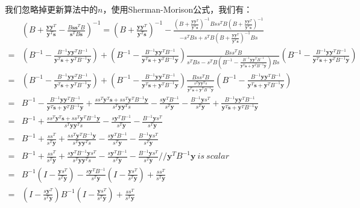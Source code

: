 我们忽略掉更新算法中的$n$，使用Sherman-Morison公式，我们有：
\begin{displaymath}
\begin{split}
&(B + \frac{\mathbf{y}\mathbf{y}^T}{\mathbf{y}^T\mathbf{s}} - \frac{B\mathbf{s}\mathbf{s}^TB}{\mathbf{s}^T B \mathbf{s}})^{-1}
=(B + \frac{\mathbf{y}\mathbf{y}^T}{\mathbf{y}^T\mathbf{s}})^{-1} -
\frac{(B + \frac{\mathbf{y}\mathbf{y}^T}{\mathbf{y}^T\mathbf{s}})^{-1}Bss^TB(B + \frac{\mathbf{y}\mathbf{y}^T}{\mathbf{y}^T\mathbf{s}})^{-1}}{-s^TBs+s^TB(B + \frac{\mathbf{y}\mathbf{y}^T}{\mathbf{y}^T\mathbf{s}})^{-1}Bs}\\
=&(B^{-1}-\frac{B^{-1}\mathbf{yy}^TB^{-1}}{\mathbf{y}^T\mathbf{s} + \mathbf{y}^TB^{-1}\mathbf{y}}) +
(B^{-1}-\frac{B^{-1}\mathbf{yy}^TB^{-1}}{\mathbf{y}^T\mathbf{s} + \mathbf{y}^TB^{-1}\mathbf{y}})
\frac{Bss^TB}{s^TBs-s^TB (B^{-1}-\frac{B^{-1}\mathbf{yy}^TB^{-1}}{\mathbf{y}^T\mathbf{s} + \mathbf{y}^TB^{-1}\mathbf{y}}) Bs}
(B^{-1}-\frac{B^{-1}\mathbf{yy}^TB^{-1}}{\mathbf{y}^T\mathbf{s} + \mathbf{y}^TB^{-1}\mathbf{y}})\\
=&(B^{-1}-\frac{B^{-1}\mathbf{yy}^TB^{-1}}{\mathbf{y}^T\mathbf{s} + \mathbf{y}^TB^{-1}\mathbf{y}}) +
(B^{-1}-\frac{B^{-1}\mathbf{yy}^TB^{-1}}{\mathbf{y}^T\mathbf{s} + \mathbf{y}^TB^{-1}\mathbf{y}})
\frac{Bss^TB}{
\frac{s^T\mathbf{yy}^Ts}{\mathbf{y}^T\mathbf{s} + \mathbf{y}^TB^{-1}\mathbf{y}}
}
(B^{-1}-\frac{B^{-1}\mathbf{yy}^TB^{-1}}{\mathbf{y}^T\mathbf{s} + \mathbf{y}^TB^{-1}\mathbf{y}})\\
=&B^{-1}-\frac{B^{-1}\mathbf{yy}^TB^{-1}}{\mathbf{y}^T\mathbf{s} + \mathbf{y}^TB^{-1}\mathbf{y}}
+\frac{ss^T\mathbf{y}^T\mathbf{s} + ss^T\mathbf{y}^TB^{-1}\mathbf{y}}{s^T\mathbf{yy}^Ts}
-\frac{s\mathbf{y}^TB^{-1}}{s^T\mathbf{y}}
-\frac{B^{-1}\mathbf{y}s^T}{s^T\mathbf{y}}
+\frac{B^{-1}\mathbf{y}\mathbf{y}^TB^{-1}}{\mathbf{y}^T\mathbf{s} + \mathbf{y}^TB^{-1}\mathbf{y}}\\
=&B^{-1}
+\frac{ss^T\mathbf{y}^T\mathbf{s} + ss^T\mathbf{y}^TB^{-1}\mathbf{y}}{s^T\mathbf{yy}^Ts}
-\frac{s\mathbf{y}^TB^{-1}}{s^T\mathbf{y}}
-\frac{B^{-1}\mathbf{y}s^T}{s^T\mathbf{y}}\\
=&B^{-1}
+\frac{ss^T}{s^T\mathbf{y}}
+\frac{ss^T\mathbf{y}^TB^{-1}\mathbf{y}}{s^T\mathbf{yy}^Ts}
-\frac{s\mathbf{y}^TB^{-1}}{s^T\mathbf{y}}
-\frac{B^{-1}\mathbf{y}s^T}{s^T\mathbf{y}}\\
=&B^{-1}
+\frac{ss^T}{s^T\mathbf{y}}
+\frac{s\mathbf{y}^TB^{-1}\mathbf{y}s^T}{s^T\mathbf{yy}^Ts}
-\frac{s\mathbf{y}^TB^{-1}}{s^T\mathbf{y}}
-\frac{B^{-1}\mathbf{y}s^T}{s^T\mathbf{y}} // \mathbf{y}^TB^{-1}\mathbf{y}~is~scalar \\
=&B^{-1}(I-\frac{\mathbf{y}s^T}{s^T\mathbf{y}})-\frac{s\mathbf{y}^TB^{-1}}{s^T\mathbf{y}}(I-\frac{\mathbf{y}s^T}{s^T\mathbf{y}}) + \frac{ss^T}{s^T\mathbf{y}}\\
=&(I-\frac{s\mathbf{y}^T}{s^T\mathbf{y}})B^{-1}(I-\frac{\mathbf{y}s^T}{s^T\mathbf{y}}) + \frac{ss^T}{s^T\mathbf{y}}\\
\end{split}
\end{displaymath}

